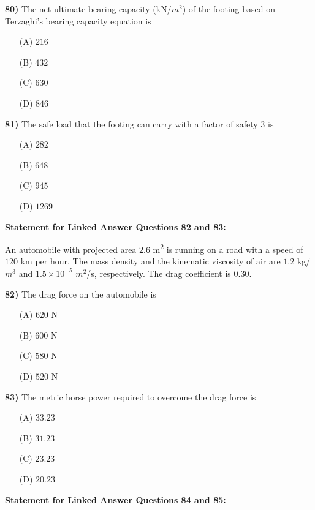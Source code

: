 \documentclass[journal]{IEEEtran}
\begin{document}
\begin{enumerate}
\textbf{80)} The net ultimate bearing capacity (kN/$m^{2}$) of the footing based on Terzaghi's bearing capacity equation is \textbf{}
\begin{itemize}
    \item[(A)] $216$
    \item[(B)] $432$
    \item[(C)] $630$
    \item[(D)] $846$
\end{itemize}

\textbf{81)} The safe load  that the footing can carry with a factor of safety $3$ is \textbf{}
\begin{itemize}
    \item[(A)] $282$
    \item[(B)] $648$
    \item[(C)] $945$
    \item[(D)] $1269$
\end{itemize}

\vspace{0.5cm}
\textbf{Statement for Linked Answer Questions 82 and 83:}

An automobile with projected area $2.6$ m\textsuperscript{2} is running on a road with a speed of $120$ km per hour. The mass density and the kinematic viscosity of air are $1.2$ kg/$m^{3}$ and $1.5 \times 10^{-5}$ $m^{2}$/s, respectively. The drag coefficient is $0.30$.

\textbf{82)} The drag force on the automobile is \textbf{}
\begin{itemize}
    \item[(A)] $620$ N
    \item[(B)] $600$ N
    \item[(C)] $580$ N
    \item[(D)] $520$ N
\end{itemize}

\textbf{83)} The metric horse power required to overcome the drag force is \textbf{}
\begin{itemize}
    \item[(A)] $33.23$
    \item[(B)] $31.23$
    \item[(C)] $23.23$
    \item[(D)] $20.23$
\end{itemize}

\vspace{0.5cm}
\textbf{Statement for Linked Answer Questions 84 and 85:}


\end{enumerate}
\end{document}
